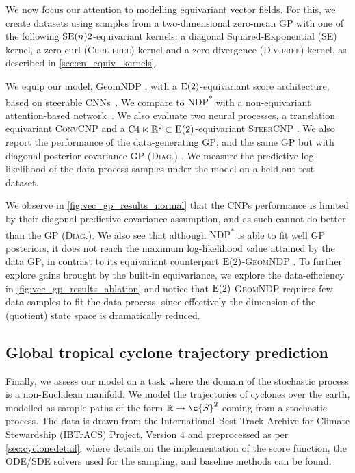 We now focus our attention to modelling equivariant vector fields.
For this, we create datasets using samples from a two-dimensional zero-mean GP with one of the following \(\groupSE{2}\)-equivariant kernels: a diagonal Squared-Exponential ({\scshape SE}) kernel, a zero curl ({\scshape Curl-free}) kernel and a zero divergence ({\scshape Div-free}) kernel, as described in \cref{sec:en_equiv_kernels}.

We equip our model, GeomNDP \!\!\!, with a \(\groupE[2]{}\)-equivariant score architecture, based on steerable CNNs~\parencite{thomas2018tensor,weiler2023equivariant}.
We compare to {\scshape NDP\textsuperscript{*}} with a non-equivariant attention-based network~\parencite{dutordoir2022Neural}.
We also evaluate two neural processes, a translation equivariant {\scshape ConvCNP} \parencite{gordon2019Convolutional} and a \(\mathrm{C}4 \ltimes \R^2 \subset \groupE[2]{}\)-equivariant {\scshape SteerCNP} \parencite{holderrieth2021equivariant}.
We also report the performance of the data-generating {\scshape GP}, and the same GP but with diagonal posterior covariance {\scshape GP (Diag.)
	}.
We measure the predictive log-likelihood of the data process samples under the model on a held-out test dataset.

We observe in \cref{fig:vec_gp_results_normal} that the CNPs performance is limited by their diagonal predictive covariance assumption, and as such cannot do better than the {\scshape GP (Diag.)}.
We also see that although {\scshape NDP\textsuperscript{*}} is able to fit well GP posteriors, it does not reach the maximum log-likelihood value attained by the data {\scshape GP}, in contrast to its equivariant counterpart {\scshape \(\groupE[2]{}\)-GeomNDP }.
To further explore gains brought by the built-in equivariance, we explore the data-efficiency in \cref{fig:vec_gp_results_ablation}  and notice that {\scshape \(\groupE[2]{}\)-GeomNDP } requires few data samples to fit the data process, since effectively the dimension of the (quotient) state space is dramatically reduced.




\subsection{Global tropical cyclone trajectory prediction}
\label{sec:cyclone_tracking}

Finally, we assess our model on a task where the domain of the stochastic process is a non-Euclidean manifold.
We model the trajectories of cyclones over the earth, modelled as sample paths of the form \(\R \to \c{S}^2\) coming from a stochastic process.
The data is drawn from the International Best Track Archive for Climate Stewardship (IBTrACS) Project, Version 4 \cite{IBTrACSv4paper,IBTrACSv4data} and preprocessed as per \cref{sec:cyclonedetail}, where details on the implementation of the score function, the ODE/SDE solvers used for the sampling, and baseline methods can be found.

